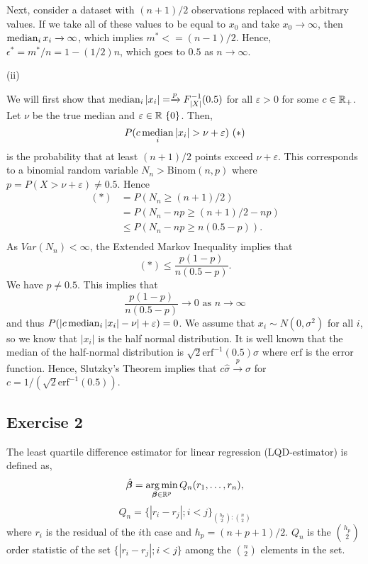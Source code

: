 \noindent Next, consider a dataset with $(n+1)/2$ observations replaced with arbitrary values. If we take all of these values to be equal to $x_0$ and take $x_0 \xrightarrow{} \infty$, then $\operatorname*{median}_i x_i \xrightarrow{} \infty$, which implies $m^* <= (n-1)/2$. Hence, $\epsilon^* = m^*/n = 1 - (1/2)n$, which goes to $0.5$ as $n \xrightarrow{} \infty$.

\noindent (ii)

\noindent We will first show that $\operatorname*{median}_i|x_i| =\xrightarrow{p} F^{-1}_{|X|}(0.5)$ for all $\varepsilon > 0$ for some $c \in \mathbb{R}_+$. Let $\nu$ be the true median and $\varepsilon \in \bbR \ \{0\}$. Then, 
\begin{equation*}
    P(c\operatorname*{median}_i|x_i| > \nu + \varepsilon)\ (*)
\end{equation*} 
is the probability that at least $(n+1)/2$ points exceed $\nu + \varepsilon$. This corresponds to a binomial random variable $N_n > \mathrm{Binom}(n,p)$ where $p = P(X > \nu + \varepsilon) \not= 0.5$. Hence
\begin{align}
    (*) &= P(N_n \geq (n+1)/2)\\
        &= P(N_n - np \geq (n+1)/2 - np)\\
        &\leq P(N_n - np \geq n(0.5-p)).\\
\end{align}
As $Var(N_n) < \infty$, the Extended Markov Inequality implies that
\begin{equation*}
    (*) \leq \frac{p(1-p)}{n(0.5-p)}.
\end{equation*}
We have $p \not= 0.5$. This implies that
\begin{equation*}
    \frac{p(1-p)}{n(0.5-p)} \xrightarrow{} 0\text{ as } n \xrightarrow{} \infty
\end{equation*}
and thus $P(|c\operatorname*{median}_i|x_i| - \nu| + \varepsilon) = 0$. We assume that $x_i\sim N(0,\sigma^2)$ for all $i$, so we know that $|x_i|$ is the half normal distribution. It is well known that the median of the half-normal distribution is $\sqrt{2} \mathrm{erf}^{-1}(0.5) \sigma$ where $\mathrm{erf}$ is the error function. Hence, Slutzky's Theorem implies that $c\hat\sigma \xrightarrow{p} \sigma$ for $c = 1/(\sqrt{2} \mathrm{erf}^{-1}(0.5))$.

\subsection*{Exercise 2}

The least quartile difference estimator for linear regression (LQD-estimator) \cite{croux1994generalized} is defined as,
$$ \hat{\bm{\beta}} = \operatorname*{arg\,min}_{\bm{\beta} \in \mathbb{R}^p} Q_n(r_1,\hdots,r_n), $$
$$ Q_n = \{|r_i - r_j|; i < j \}_{\binom{h_p}{2}:\binom{n}{2}} $$
where $r_i$ is the residual of the $i$th case and $h_p = (n+p+1)/2$. $Q_n$ is the $\binom{h_p}{2}$ order statistic of the set $\{|r_i - r_j|; i < j \}$ among the $\binom{n}{2}$ elements in the set. 

